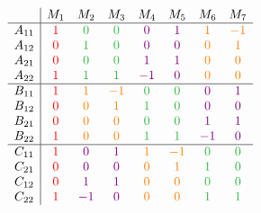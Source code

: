 \documentclass[MS]{wfuthesis}
\begin{document}
                    \begin{multicols}{2}
                        \[\begin{array}{c|ccccccc}
                                & M_1 & M_2 & M_3 & M_4 & M_5 & M_6 & M_7 \\
                                \hline
                                A_{11} & \color{red} 1 & \color{mycustomgreen} 0 & \color{mycustomgreen} 0 & \color{violet} 0 & \color{violet} 1 & \color{orange} 1 & \color{orange} -1 \\
                                A_{12} & \color{red} 0 & \color{mycustomgreen} 1 & \color{mycustomgreen} 0 & \color{violet} 0 & \color{violet} 0 & \color{orange} 0 & \color{orange} 1 \\
                                A_{21} & \color{red} 0 & \color{mycustomgreen} 0 & \color{mycustomgreen} 0 & \color{violet} 1 & \color{violet} 1 & \color{orange} 0 & \color{orange} 0 \\
                                A_{22} & \color{red} 1 & \color{mycustomgreen} 1 & \color{mycustomgreen} 1 & \color{violet} -1 & \color{violet} 0 & \color{orange} 0 & \color{orange} 0 \\
                                \hline
                                B_{11} & \color{red} 1 & \color{orange} 1 & \color{orange} -1 & \color{mycustomgreen} 0 & \color{mycustomgreen} 0 & \color{violet} 0 & \color{violet} 1 \\
                                B_{12} & \color{red} 0 & \color{orange} 0 & \color{orange} 1 & \color{mycustomgreen} 1 & \color{mycustomgreen} 0 & \color{violet} 0 & \color{violet} 0 \\
                                B_{21} & \color{red} 0 & \color{orange} 0 & \color{orange} 0 & \color{mycustomgreen} 0 & \color{mycustomgreen} 0 & \color{violet} 1 & \color{violet} 1 \\
                                B_{22} & \color{red} 1 & \color{orange} 0 & \color{orange} 0 & \color{mycustomgreen} 1 & \color{mycustomgreen} 1 & \color{violet} -1 & \color{violet} 0 \\
                                \hline
                                C_{11} & \color{red} 1 & \color{violet} 0 & \color{violet} 1 & \color{orange} 1 & \color{orange} -1 & \color{mycustomgreen} 0 & \color{mycustomgreen} 0 \\
                                C_{21} & \color{red} 0 & \color{violet} 0 & \color{violet} 0 & \color{orange} 0 & \color{orange} 1 & \color{mycustomgreen} 1 & \color{mycustomgreen} 0 \\
                                C_{12} & \color{red} 0 & \color{violet} 1 & \color{violet} 1 & \color{orange} 0 & \color{orange} 0 & \color{mycustomgreen} 0 & \color{mycustomgreen} 0 \\
                                C_{22} & \color{red} 1 & \color{violet} -1 & \color{violet} 0 & \color{orange} 0 & \color{orange} 0 & \color{mycustomgreen} 1 & \color{mycustomgreen} 1 \\
                        \end{array}\]


\end{multicols}
\end{document}
